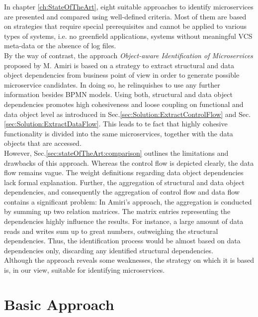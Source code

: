 \endgroup
\vspace{0.5cm}

\noindent
In chapter \ref{ch:StateOfTheArt}, eight suitable approaches to identify microservices are presented and compared using well-defined criteria. Most of them are based on strategies that require special prerequisites and cannot be applied to various types of systems, i.e. no greenfield applications, systems without meaningful VCS meta-data or the absence of log files. \\
By the way of contrast, the approach \textit{Object-aware Identification of Microservices} proposed by M. Amiri \cite{ObjectAwareAmiri} is based on a strategy to extract structural and data object dependencies from business point of view in order to generate possible microservice candidates. In doing so, he relinquishes to use any further information besides BPMN models. Using both, structural and data object dependencies promotes high cohesiveness and loose coupling on functional and data object level as introduced in Sec.\ref{sec:Solution:ExtractControlFlow} and Sec.\ref{sec:Solution:ExtractDataFlow}. This leads to te fact that highly cohesive functionality is divided into the same microservices, together with the data objects that are accessed.  \\
However, Sec.\ref{sec:stateOfTheArt:comparison} outlines the limitations and drawbacks of this approach. Whereas the control flow is depicted clearly, the data flow remains vague. The weight definitions regarding data object dependencies lack formal explanation. Further, the aggregation of structural and data object dependencies, and consequently the aggregation of control flow and data flow contains a significant problem: In Amiri's approach, the aggregation is conducted by summing up two relation matrices. The matrix entries representing the dependencies highly influence the results. For instance, a large amount of data reads and writes sum up to great numbers, outweighing the structural dependencies. Thus, the identification process would be almost based on data dependencies only, discarding any identified structural dependencies. \\
Although the approach reveals some weaknesses, the strategy on which it is based is, in our view, suitable for identifying microservices.






\section{Basic Approach}

